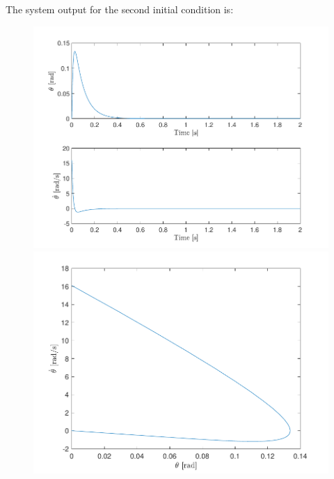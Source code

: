 \documentclass[10pt]{article}
\begin{document}
The system output for the second initial condition is:
\begin{figure}[ht]
    \centering
    \begin{minipage}[b]{0.45\textwidth}
        \centering
        \includegraphics[clip,width=1\linewidth]{lab1/figs/section7_controlled_state_evolution_x_0_2.pdf}
    \end{minipage}
    \begin{minipage}[b]{0.45\textwidth}
        \centering
        \includegraphics[clip,width=1\linewidth]{lab1/figs/section7_controlled_state_orbit_x_0_2.pdf}
    \end{minipage}
\end{figure}
\end{document}
